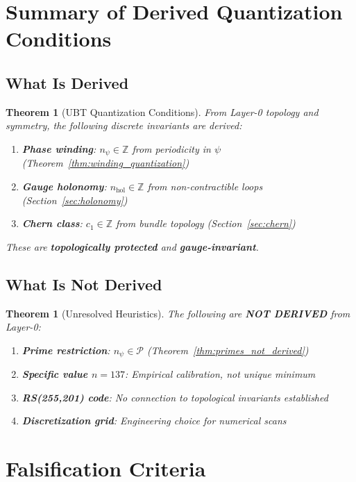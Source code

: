 \documentclass[12pt]{article}
\newtheorem{theorem}[definition]{Theorem}
\newcommand{\Z}{\mathbb{Z}}
\begin{document}
\section{Summary of Derived Quantization Conditions}

\subsection{What Is Derived}

\begin{theorem}[UBT Quantization Conditions]
From Layer-0 topology and symmetry, the following discrete invariants are derived:
\begin{enumerate}
    \item \textbf{Phase winding}: $n_\psi \in \Z$ from periodicity in $\psi$ (Theorem~\ref{thm:winding_quantization})
    \item \textbf{Gauge holonomy}: $n_{\text{hol}} \in \Z$ from non-contractible loops (Section~\ref{sec:holonomy})
    \item \textbf{Chern class}: $c_1 \in \Z$ from bundle topology (Section~\ref{sec:chern})
\end{enumerate}
These are \textbf{topologically protected} and \textbf{gauge-invariant}.
\end{theorem}

\subsection{What Is Not Derived}

\begin{theorem}[Unresolved Heuristics]
The following are \textbf{NOT DERIVED} from Layer-0:
\begin{enumerate}
    \item \textbf{Prime restriction}: $n_\psi \in \mathcal{P}$ (Theorem~\ref{thm:primes_not_derived})
    \item \textbf{Specific value $n=137$}: Empirical calibration, not unique minimum
    \item \textbf{RS(255,201) code}: No connection to topological invariants established
    \item \textbf{Discretization grid}: Engineering choice for numerical scans
\end{enumerate}
\end{theorem}

\section{Falsification Criteria}
\label{sec:falsification}
\end{document}
